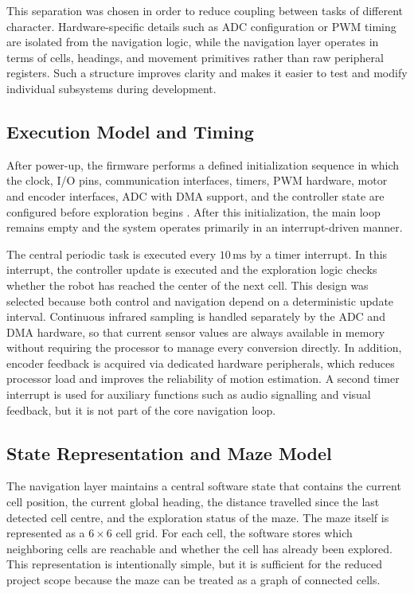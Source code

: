 This separation was chosen in order to reduce coupling between tasks of different character. Hardware-specific details such as ADC configuration or PWM timing are isolated from the navigation logic, while the navigation layer operates in terms of cells, headings, and movement primitives rather than raw peripheral registers. Such a structure improves clarity and makes it easier to test and modify individual subsystems during development.

\subsection{Execution Model and Timing}

After power-up, the firmware performs a defined initialization sequence in which the clock, I/O pins, communication interfaces, timers, PWM hardware, motor and encoder interfaces, ADC with DMA support, and the controller state are configured before exploration begins \cite{datasheet_dspic}. After this initialization, the main loop remains empty and the system operates primarily in an interrupt-driven manner.

The central periodic task is executed every $10\,\mathrm{ms}$ by a timer interrupt. In this interrupt, the controller update is executed and the exploration logic checks whether the robot has reached the center of the next cell. This design was selected because both control and navigation depend on a deterministic update interval. Continuous infrared sampling is handled separately by the ADC and DMA hardware, so that current sensor values are always available in memory without requiring the processor to manage every conversion directly. In addition, encoder feedback is acquired via dedicated hardware peripherals, which reduces processor load and improves the reliability of motion estimation. A second timer interrupt is used for auxiliary functions such as audio signalling and visual feedback, but it is not part of the core navigation loop.

\subsection{State Representation and Maze Model}

The navigation layer maintains a central software state that contains the current cell position, the current global heading, the distance travelled since the last detected cell centre, and the exploration status of the maze. The maze itself is represented as a $6 \times 6$ cell grid. For each cell, the software stores which neighboring cells are reachable and whether the cell has already been explored. This representation is intentionally simple, but it is sufficient for the reduced project scope because the maze can be treated as a graph of connected cells.

